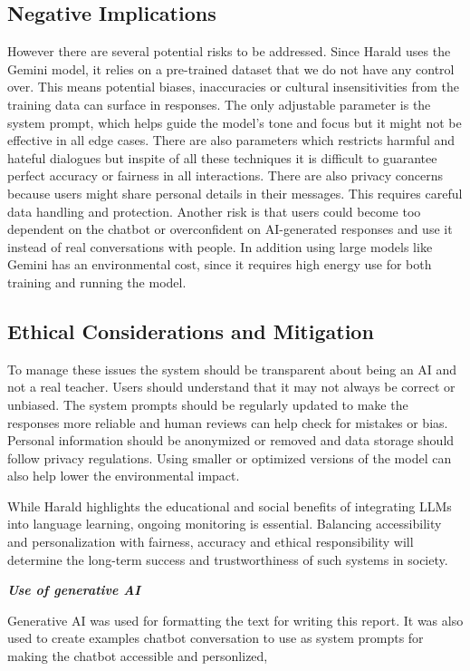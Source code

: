 \documentclass[a4paper,10pt]{article}
\begin{document}
\subsection{Negative Implications}
However there are several potential risks to be addressed. Since Harald uses the Gemini model, it relies on a pre-trained dataset that we do not have any control over. This means potential biases, inaccuracies or cultural insensitivities from the training data can surface in responses. The only adjustable parameter is the system prompt, which helps guide the model’s tone and focus but it might not be effective in all edge cases. There are also parameters which restricts harmful and hateful dialogues but inspite of all these techniques it is difficult to guarantee perfect accuracy or fairness in all interactions. There are also privacy concerns because users might share personal details in their messages. This requires careful data handling and protection. Another risk is that users could become too dependent on the chatbot or overconfident on AI-generated responses and use it instead of real conversations with people. In addition using large models like Gemini has an environmental cost, since it requires high energy use for both training and running the model.

\subsection{Ethical Considerations and Mitigation}
To manage these issues the system should be transparent about being an AI and not a real teacher. Users should understand that it may not always be correct or unbiased. The system prompts should be regularly updated to make the responses more reliable and human reviews can help check for mistakes or bias. Personal information should be anonymized or removed and data storage should follow privacy regulations. Using smaller or optimized versions of the model can also help lower the environmental impact.

While Harald highlights the educational and social benefits of integrating LLMs into language learning, ongoing monitoring is essential. Balancing accessibility and personalization with fairness, accuracy and ethical responsibility will determine the long-term success and trustworthiness of such systems in society.
	
\hfill \break
\textit{\textbf{Use of generative AI}}

Generative AI was used for formatting the text for writing this report. It was also used to create examples chatbot conversation to use as system prompts for making the chatbot accessible and personlized,
\end{document}
